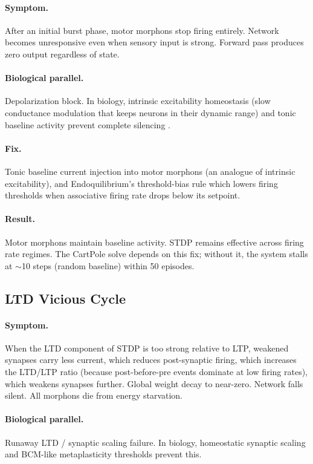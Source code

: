 \paragraph{Symptom.}
After an initial burst phase, motor morphons stop firing entirely. Network becomes unresponsive even when sensory input is strong. Forward pass produces zero output regardless of state.

\paragraph{Biological parallel.}
Depolarization block. In biology, intrinsic excitability homeostasis (slow conductance modulation that keeps neurons in their dynamic range) and tonic baseline activity prevent complete silencing \cite{turrigiano1998activity}.

\paragraph{Fix.}
Tonic baseline current injection into motor morphons (an analogue of intrinsic excitability), and Endoquilibrium's threshold-bias rule which lowers firing thresholds when associative firing rate drops below its setpoint.

\paragraph{Result.}
Motor morphons maintain baseline activity. STDP remains effective across firing rate regimes. The CartPole solve depends on this fix; without it, the system stalls at $\sim$10 steps (random baseline) within 50 episodes.

\subsection{LTD Vicious Cycle}

\paragraph{Symptom.}
When the LTD component of STDP is too strong relative to LTP, weakened synapses carry less current, which reduces post-synaptic firing, which increases the LTD/LTP ratio (because post-before-pre events dominate at low firing rates), which weakens synapses further. Global weight decay to near-zero. Network falls silent. All morphons die from energy starvation.

\paragraph{Biological parallel.}
Runaway LTD / synaptic scaling failure. In biology, homeostatic synaptic scaling \cite{turrigiano2008homeostatic} and BCM-like metaplasticity thresholds \cite{bienenstock1982bcm} prevent this.

